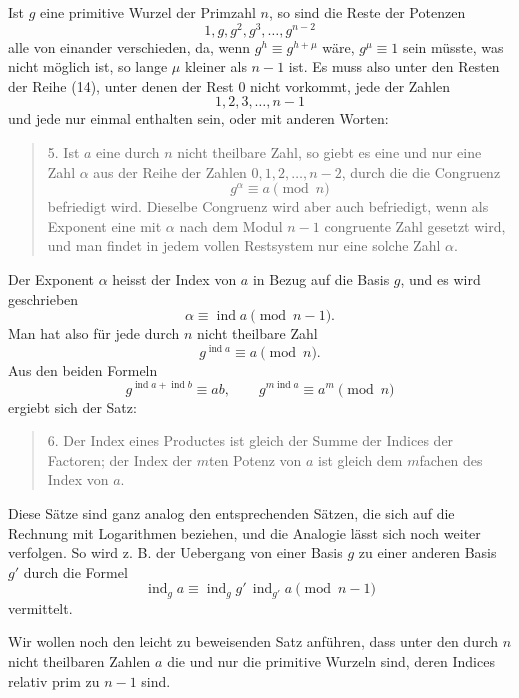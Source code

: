 \documentclass[11pt]{article}
\begin{document}
Ist $g$ eine primitive Wurzel der Primzahl $n$, so sind die Reste der Potenzen
\[
\tag{14}       1,g,g^2,g^3,\ldots,g^{n-2}
\]
alle von einander verschieden, da, wenn $g^h\equiv g^{h+\mu}$ wäre, $g^\mu\equiv1$ sein müsste, was nicht möglich ist, so lange $\mu$ kleiner als $n-1$ ist. Es muss also unter den Resten der Reihe (14), unter denen der Rest $0$ nicht vorkommt, jede der Zahlen
\[
\tag{15}       1,2,3,\ldots,n-1
\]
und jede nur einmal enthalten sein, oder mit anderen Worten:
\begin{quote}
5. Ist $a$ eine durch $n$ nicht theilbare Zahl, so giebt es eine und nur eine Zahl $\alpha$ aus der Reihe der Zahlen $0,1,2,\ldots,n-2$, durch die die Congruenz
\[
\tag{16}       g^\alpha\equiv a\pmod n
\]
befriedigt wird. Dieselbe Congruenz wird aber auch befriedigt, wenn als Exponent eine mit $\alpha$ nach dem Modul $n-1$ congruente Zahl gesetzt wird, und man findet in jedem vollen Restsystem nur eine solche Zahl $\alpha$.
\end{quote}
Der Exponent $\alpha$ heisst der Index von $a$ in Bezug auf die Basis $g$, und es wird geschrieben
\[
\tag{17}       \alpha\equiv\operatorname{ind} a\pmod{n-1}.
\]
Man hat also für jede durch $n$ nicht theilbare Zahl
\[
\tag{18}       g^{\operatorname{ind}a}\equiv a\pmod n.
\]
Aus den beiden Formeln
\[
\tag{19}       g^{\operatorname{ind}a+\operatorname{ind}b}\equiv ab,
        \qquad g^{m\operatorname{ind}a}\equiv a^m\pmod n
\]
ergiebt sich der Satz:
\begin{quote}
6. Der Index eines Productes ist gleich der Summe der Indices der Factoren; der Index der $m$ten Potenz von $a$ ist gleich dem $m$fachen des Index von $a$.
\end{quote}
Diese Sätze sind ganz analog den entsprechenden Sätzen, die sich auf die Rechnung mit Logarithmen beziehen, und die Analogie lässt sich noch weiter verfolgen. So wird z. B. der Uebergang von einer Basis $g$ zu einer anderen Basis $g'$ durch die Formel
\[
\tag{20}       \operatorname{ind}_g a\equiv \operatorname{ind}_g g'\,\operatorname{ind}_{g'}a\pmod{n-1}
\]
vermittelt.

Wir wollen noch den leicht zu beweisenden Satz anführen, dass unter den durch $n$ nicht theilbaren Zahlen $a$ die und nur die primitive Wurzeln sind, deren Indices relativ prim zu $n-1$ sind.
\end{document}
